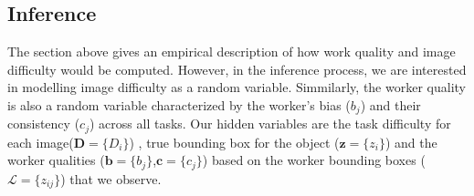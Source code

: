 \documentclass[12pt]{article}
\begin{document}
\subsection{Inference}
\par The section above gives an empirical description of how work quality and image difficulty would be computed. However, in the inference process, we are interested in modelling image difficulty as a random variable. Simmilarly, the worker quality is also a random variable characterized by the worker's bias ($b_j$) and their consistency ($c_j$) across all tasks. Our hidden variables are the task difficulty for each image($\textbf{D}=\{D_i\}$) , true bounding box for the object ($\textbf{z}=\{z_i\}$) and the worker qualities ($\textbf{b}=\{b_j\}$,$\textbf{c}=\{c_j\}$) based on the worker bounding boxes ($\mathcal{L}=\{z_{ij}\}$) that we observe.
\end{document}
